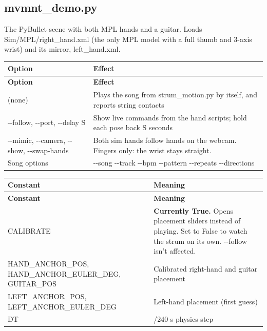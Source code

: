 \documentclass[11pt,letterpaper]{article}
\newcommand{\code}[1]{\textcolor{codeblue}{\ttfamily\smaller\relax #1}}
\begin{document}
\subsection{mvmnt\_demo.py}
The PyBullet scene with both MPL hands and a guitar. Loads \code{Sim/\allowbreak{}MPL/\allowbreak{}right\_\allowbreak{}hand.xml} (the only MPL model with a full thumb and 3-axis wrist) and its mirror, \code{left\_\allowbreak{}hand.xml}.

{\small
\begin{longtable}{|>{\raggedright\arraybackslash}p{}|>{\raggedright\arraybackslash}p{}|}
\hline
\rowcolor{tblhead}\textbf{Option} & \textbf{Effect} \\ \hline
\endfirsthead
\hline
\rowcolor{tblhead}\textbf{Option} & \textbf{Effect} \\ \hline
\endhead
(none) & Plays the song from \code{strum\_\allowbreak{}motion.py} by itself, and reports string contacts \\ \hline
\code{-{}-{}follow}, \code{-{}-{}port}, \code{-{}-{}delay S} & Show live commands from the hand scripts; hold each pose back S seconds \\ \hline
\code{-{}-{}mimic}, \code{-{}-{}camera}, \code{-{}-{}show}, \code{-{}-{}swap-{}\allowbreak{}hands} & Both sim hands follow hands on the webcam. Fingers only: the wrist stays straight. \\ \hline
Song options & \code{-{}-{}song -{}-{}track -{}-{}bpm -{}-{}pattern -{}-{}repeats -{}-{}directions} \\ \hline
\end{longtable}}

{\small
\begin{longtable}{|>{\raggedright\arraybackslash}p{}|>{\raggedright\arraybackslash}p{}|}
\hline
\rowcolor{tblhead}\textbf{Constant} & \textbf{Meaning} \\ \hline
\endfirsthead
\hline
\rowcolor{tblhead}\textbf{Constant} & \textbf{Meaning} \\ \hline
\endhead
\code{CALIBRATE} & \textbf{Currently \code{True}.} Opens placement sliders instead of playing. Set to \code{False} to watch the strum on its own. \code{-{}-{}follow} isn't affected. \\ \hline
\code{HAND\_\allowbreak{}ANCHOR\_\allowbreak{}POS}, \code{HAND\_\allowbreak{}ANCHOR\_\allowbreak{}EULER\_\allowbreak{}DEG}, \code{GUITAR\_\allowbreak{}POS} & Calibrated right-hand and guitar placement \\ \hline
\code{LEFT\_\allowbreak{}ANCHOR\_\allowbreak{}POS}, \code{LEFT\_\allowbreak{}ANCHOR\_\allowbreak{}EULER\_\allowbreak{}DEG} & Left-hand placement (first guess) \\ \hline
\code{DT} & 1/240 s physics step \\ \hline
\end{longtable}}
\end{document}
